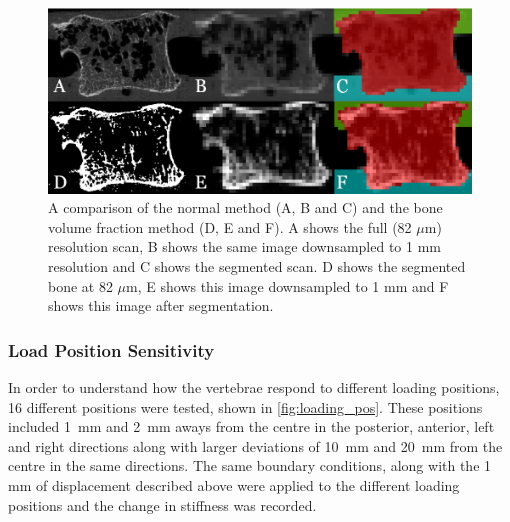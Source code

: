 \begin{figure}[ht!]
\centering
\includegraphics[width=.65\textwidth]{Chapters/Chapter_HT_images/normal_vs_bvtv_seg.png}
	\caption{A comparison of the normal method (A, B and C) and the bone volume fraction method (D, E and F). A shows the full (82 $\mu$m) resolution scan, B shows the same image downsampled to 1 mm resolution and C shows the segmented scan. D shows the segmented bone at 82 $\mu$m, E shows this image downsampled to 1 mm and F shows this image after segmentation.}
\label{fig:normal_vs_bv_tv_seg}
\end{figure}






\subsubsection{Load Position Sensitivity}

In order to understand how the vertebrae respond to different loading positions, 16 different positions were tested, shown in \cref{fig:loading_pos}.
These positions included 1~mm and 2~mm aways from the centre in the posterior, anterior, left and right directions along with larger deviations of 10~mm and 20~mm from the centre in the same directions.
The same boundary conditions, along with the 1 mm of displacement described above were applied to the different loading positions and the change in stiffness was recorded.

